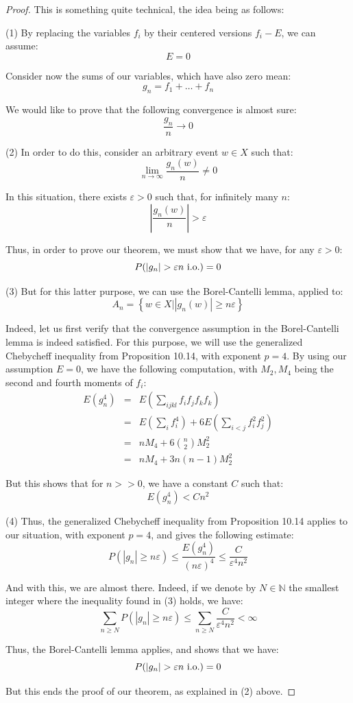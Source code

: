 \documentclass[12pt]{amsbook}
\begin{document}
\begin{proof}
This is something quite technical, the idea being as follows:

\medskip

(1) By replacing the variables $f_i$ by their centered versions $f_i-E$, we can assume:
$$E=0$$

Consider now the sums of our variables, which have also zero mean:
$$g_n=f_1+\ldots+f_n$$

We would like to prove that the following convergence is almost sure:
$$\frac{g_n}{n}\to0$$

(2) In order to do this, consider an arbitrary event $w\in X$ such that:
$$\lim_{n\to\infty}\frac{g_n(w)}{n}\neq0$$

In this situation, there exists $\varepsilon>0$ such that, for infinitely many $n$:
$$\left|\frac{g_n(w)}{n}\right|>\varepsilon$$

Thus, in order to prove our theorem, we must show that we have, for any $\varepsilon>0$:
$$P(|g_n|>\varepsilon n\ {\rm i.o.})=0$$

(3) But for this latter purpose, we can use the Borel-Cantelli lemma, applied to:
$$A_n=\left\{w\in X\Big||g_n(w)|\geq n\varepsilon\right\}$$

Indeed, let us first verify that the convergence assumption in the Borel-Cantelli lemma is indeed satisfied. For this purpose, we will use the generalized Chebycheff inequality from Proposition 10.14, with exponent $p=4$. By using our assumption $E=0$, we have the following computation, with $M_2,M_4$ being the second and fourth moments of $f_i$:
\begin{eqnarray*}
E(g_n^4)
&=&E\left(\sum_{ijkl}f_if_jf_kf_k\right)\\
&=&E\left(\sum_if_i^4\right)+6E\left(\sum_{i<j}f_i^2f_j^2\right)\\
&=&nM_4+6\binom{n}{2}M_2^2\\
&=&nM_4+3n(n-1)M_2^2
\end{eqnarray*}

But this shows that for $n>>0$, we have a constant $C$ such that:
$$E(g_n^4)<Cn^2$$

(4) Thus, the generalized Chebycheff inequality from Proposition 10.14 applies to our situation, with exponent $p=4$, and gives the following estimate:
$$P(|g_n|\geq n\varepsilon)\leq\frac{E(g_n^4)}{(n\varepsilon)^4}\leq\frac{C}{\varepsilon^4n^2}$$

And with this, we are almost there. Indeed, if we denote by $N\in\mathbb N$ the smallest integer where the inequality found in (3) holds, we have:
$$\sum_{n\geq N}P(|g_n|\geq n\varepsilon)\leq\sum_{n\geq N}\frac{C}{\varepsilon^4n^2}<\infty$$

Thus, the Borel-Cantelli lemma applies, and shows that we have:
$$P(|g_n|>\varepsilon n\ {\rm i.o.})=0$$

But this ends the proof of our theorem, as explained in (2) above.
\end{proof}
\end{document}
